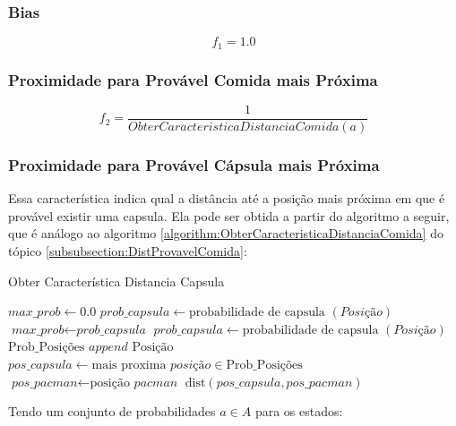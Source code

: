 \subsubsection*{Bias}
$$ f_1 = 1.0 $$

\subsubsection*{Proximidade para Provável Comida mais Próxima}
$$ f_2 = \frac{1}{ObterCaracteristicaDistanciaComida \left( a \right)} $$

\subsubsection*{Proximidade para Provável Cápsula mais Próxima}

Essa característica indica qual a distância até a posição mais próxima em que é provável existir uma capsula. Ela pode ser obtida a partir do algoritmo a seguir, que é análogo ao algoritmo \ref{algorithm:ObterCaracteristicaDistanciaComida} do tópico \ref{subsubsection:DistProvavelComida}:

\begin{algorithm}[H]
	\caption{Obter Característica Distancia Capsula} \label{algorithm:ObterCaracteristicaDistanciaCapsula}
	\begin{algorithmic}[1]
			\State $\textit{max\_prob} \gets 0.0 $
				\State $\textit{prob\_capsula} \gets \text{probabilidade de capsula } \left( \textit{Posição} \right) $
					\State $\textit{max\_prob} \gets \textit{prob\_capsula} $
				\EndIf 
			\EndFor
				\State $\textit{prob\_capsula} \gets \text{probabilidade de capsula } \left( \textit{Posição} \right) $
					\State $ \text{Prob\_Posições } append \text{ Posição} $
				\EndIf 
			\EndFor
			\State $\textit{pos\_capsula} \gets \text{mais proxima }\textit{posição} \in \text{Prob\_Posições} $
			\State $\textit{pos\_pacman} \gets \text{posição }\textit{pacman} $
			\State \Return $ \text{dist} \left( \textit{pos\_capsula}, \textit{pos\_pacman} \right) $
		\EndProcedure
	\end{algorithmic}
\end{algorithm}

Tendo um conjunto de probabilidades $ a \in A $ para os estados:

